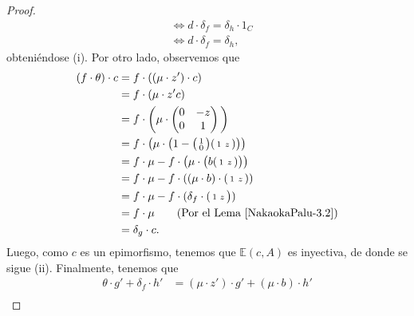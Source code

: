 \documentclass[tesis]{subfiles}
\begin{document}
\begin{proof}
\begin{align*}
                                                                               &\iff d\cdot\delta_f = \delta_h\cdot 1_C \\
                                                                               &\iff d\cdot\delta_f = \delta_h,
    \end{align*}
    obteniéndose (i). Por otro lado, observemos que
    \begin{align*}
        (f\cdot\theta)\cdot c &= f\cdot ((\mu\cdot z')\cdot c) \\
                              &= f\cdot(\mu\cdot z'c) \\
                              &= f\cdot \bigg(\mu\cdot\begin{pmatrix} 0 & -z \\ 0 & 1 \end{pmatrix}\bigg) \\
                              &= f\cdot\big(\mu\cdot\big( 1 - \big(\begin{smallmatrix} 1 \\ 0 \end{smallmatrix}\big) (\begin{smallmatrix} 1 \ z \end{smallmatrix})\big)\big) \\
                              &= f\cdot\mu - f\cdot \big(\mu\cdot\big( b(\begin{smallmatrix} 1 \ z \end{smallmatrix})\big)\big) \\
                              &= f\cdot\mu - f\cdot((\mu\cdot b)\cdot(\begin{smallmatrix} 1 \ z \end{smallmatrix})) \\
                              &= f\cdot\mu - f\cdot(\delta_f\cdot (\begin{smallmatrix} 1 &z \end{smallmatrix}\big)) \\
                              &= f\cdot\mu \tag{Por el Lema \ref{NakaokaPalu-3.2}} \\
                              &= \delta_g\cdot c.
    \end{align*}
    Luego, como $c$ es un epimorfismo, tenemos que $\mathbb{E}(c,A)$ es inyectiva, de donde se sigue (ii). Finalmente, tenemos que
    \begin{align*}
        \theta\cdot g' + \delta_f\cdot h' &= (\mu\cdot z')\cdot g' + (\mu\cdot b)\cdot h' \\

\end{align*}
\end{proof}
\end{document}
